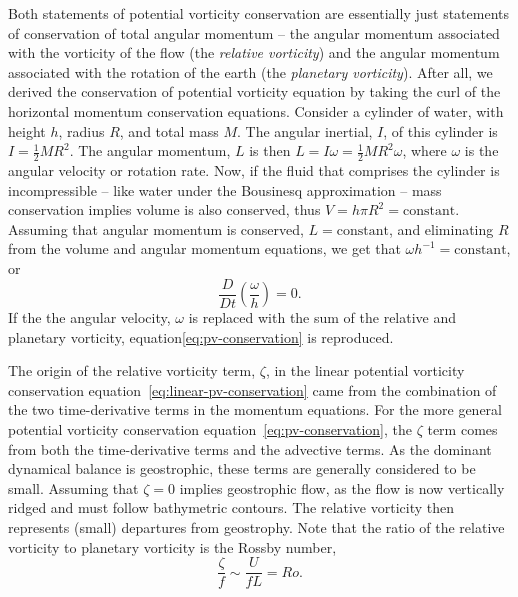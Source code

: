 \documentclass[11pt]{report}
\numberwithin{equation}{section}
\begin{document}
Both statements of potential vorticity conservation are essentially just statements of conservation of total angular momentum -- the angular momentum associated with the vorticity of the flow (the {\it relative vorticity}) and the angular momentum associated with the rotation of the earth (the {\it planetary vorticity}).  After all, we derived the conservation of potential vorticity equation by taking the curl of the horizontal momentum conservation equations.
Consider a cylinder of water, with height $h$, radius $R$, and total mass $M$.  The angular inertial, $I$, of this cylinder is $I=\frac{1}{2} M R^2$.  The angular momentum, $L$ is then $L=I \omega=\frac{1}{2} M R^2 \omega$, where $\omega$ is the angular velocity or rotation rate.  Now, if the fluid that comprises the cylinder is incompressible -- like water under the Bousinesq approximation -- mass conservation implies volume is also conserved, thus $V = h \pi R^2 = \mathrm{constant}$.  Assuming that angular momentum is conserved, $L=\mathrm{constant}$, and eliminating $R$ from the volume and angular momentum equations, we get that $\omega h^{-1}=\mathrm{constant}$, or
\begin{equation}
    \frac{D}{Dt}\left( \frac{\omega}{h} \right) = 0.
\end{equation}
If the the angular velocity, $\omega$ is replaced with the sum of the relative and planetary vorticity, equation\ref{eq:pv-conservation} is reproduced.

The origin of the relative vorticity term, $\zeta$, in the linear potential vorticity conservation equation~\ref{eq:linear-pv-conservation} came from the combination of the two time-derivative terms in the momentum equations.  For the more general potential vorticity conservation equation~\ref{eq:pv-conservation}, the $\zeta$ term comes from both the time-derivative terms and the advective terms.  As the dominant dynamical balance is geostrophic, these terms are generally considered to be small.  Assuming that $\zeta=0$ implies geostrophic flow, as the flow is now vertically ridged and must follow bathymetric contours.  The relative vorticity then represents (small) departures from geostrophy.  Note that the ratio of the relative vorticity to planetary vorticity is the Rossby number,
\begin{equation}
    \frac{\zeta}{f} \sim \frac{U}{f L} = Ro.
\end{equation}
\end{document}
